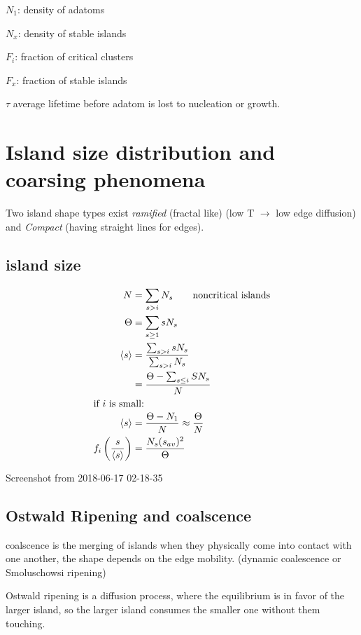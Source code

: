\documentclass[article,oneside]{memoir}
\begin{document}
$N_1$: density of adatoms

$N_{x}$: density of stable islands

$F_i$: fraction of critical clusters

$F_{x}$: fraction of stable islands

$\tau$ average lifetime before adatom is lost to nucleation or growth.


\section{Island size distribution and coarsing phenomena}

Two island shape types exist \emph{ramified} (fractal like) (low T $\rightarrow$ low edge diffusion) and \emph{Compact} (having straight lines for edges).
\subsection{island size}

\begin{align*}
        N&=\sum_{s>i}N_s\qquad \textup{noncritical islands}\\
        \Theta&=\sum_{s\geq 1}sN_{s}\\
        \langle s\rangle &= \frac{\sum_{s>i}sN_s}{\sum_{s>i}N_s}\\
        &=\frac{\Theta-\sum_{s\leq i}SN_{s}}{N}\\
        \intertext{if $i$ is small:}
        \langle s\rangle &= \frac{\Theta-N_1}{N}\approx \frac{\Theta}{N}\\
        f_{i}\left( \frac{s}{\langle s\rangle} \right)&=\frac{N_s(s_{av})^{2}}{\Theta}
\end{align*}

Screenshot from 2018-06-17 02-18-35
\subsection{Ostwald Ripening and coalscence}

coalscence is the merging of islands when they physically come into contact with one another, the shape depends on the edge mobility. (dynamic coalescence or Smoluschowsi ripening)

Ostwald ripening is a diffusion process, where the equilibrium is in favor of the larger island, so the larger island consumes the smaller one without them touching.
\end{document}
